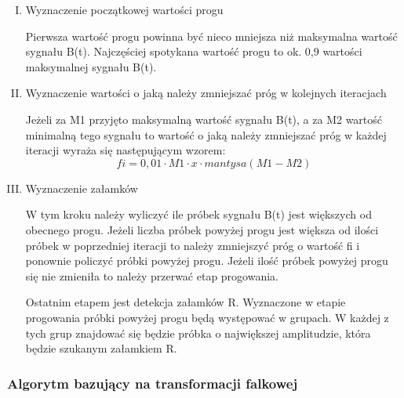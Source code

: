 \begin{enumerate}[I.]
\item Wyznaczenie początkowej wartości progu

Pierwsza wartość progu powinna być nieco mniejsza niż maksymalna wartość sygnału B(t). Najczęściej spotykana wartość progu to ok. 0,9 wartości maksymalnej sygnału B(t).
\item Wyznaczenie wartości o jaką należy zmniejszać próg w kolejnych iteracjach

Jeżeli za M1 przyjęto maksymalną wartość sygnału B(t), a za M2 wartość minimalną tego sygnału to wartość o jaką należy zmniejszać próg w każdej iteracji wyraża się następującym wzorem:
\begin{equation}
fi=0,01\cdot M1 \cdot x \cdot mantysa(M1-M2)
\end{equation}
\item Wyznaczenie załamków

W tym kroku należy wyliczyć ile próbek sygnału B(t) jest większych od obecnego progu. Jeżeli liczba próbek powyżej progu jest większa od ilości próbek w poprzedniej iteracji to należy zmniejszyć próg o wartość fi i ponownie policzyć próbki powyżej progu. Jeżeli ilość próbek powyżej progu się nie zmieniła to należy przerwać etap progowania.

Ostatnim etapem jest detekcja załamków R. Wyznaczone w etapie progowania próbki powyżej progu będą występować w grupach. W każdej z tych grup znajdować się będzie próbka o największej amplitudzie, która będzie szukanym załamkiem R.
\end{enumerate}
\subsubsection{Algorytm bazujący na transformacji falkowej}

